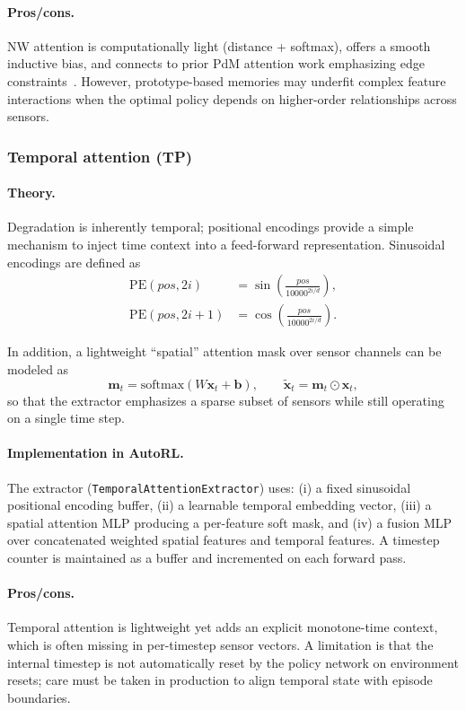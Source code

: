 \documentclass[11pt]{article}
\begin{document}
\paragraph{Pros/cons.}
NW attention is computationally light (distance + softmax), offers a smooth inductive bias, and connects to prior PdM attention work emphasizing edge constraints~\cite{Siraskar2024NWAttention}. However, prototype-based memories may underfit complex feature interactions when the optimal policy depends on higher-order relationships across sensors.

\subsubsection{Temporal attention (TP)}
\paragraph{Theory.}
Degradation is inherently temporal; positional encodings provide a simple mechanism to inject time context into a feed-forward representation. Sinusoidal encodings are defined as
\begin{align}
  \mathrm{PE}(pos,2i) &= \sin\left(\frac{pos}{10000^{2i/d}}\right),\\
  \mathrm{PE}(pos,2i{+}1) &= \cos\left(\frac{pos}{10000^{2i/d}}\right).
\end{align}

In addition, a lightweight ``spatial'' attention mask over sensor channels can be modeled as
\begin{equation}
  \mathbf{m}_t = \mathrm{softmax}(W\mathbf{x}_t + \mathbf{b}),\qquad
  \tilde{\mathbf{x}}_t = \mathbf{m}_t \odot \mathbf{x}_t,
\end{equation}
so that the extractor emphasizes a sparse subset of sensors while still operating on a single time step.

\paragraph{Implementation in AutoRL.}
The extractor (\texttt{TemporalAttentionExtractor}) uses: (i) a fixed sinusoidal positional encoding buffer, (ii) a learnable temporal embedding vector, (iii) a spatial attention MLP producing a per-feature soft mask, and (iv) a fusion MLP over concatenated weighted spatial features and temporal features. A timestep counter is maintained as a buffer and incremented on each forward pass.

\paragraph{Pros/cons.}
Temporal attention is lightweight yet adds an explicit monotone-time context, which is often missing in per-timestep sensor vectors. A limitation is that the internal timestep is not automatically reset by the policy network on environment resets; care must be taken in production to align temporal state with episode boundaries.
\end{document}
